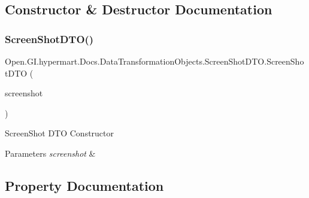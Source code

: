 \subsection{Constructor \& Destructor Documentation}
\hypertarget{class_open_1_1_g_i_1_1hypermart_1_1_docs_1_1_data_transformation_objects_1_1_screen_shot_d_t_o_a1d16d059ad949737184bd5b8061d036d}{}\label{class_open_1_1_g_i_1_1hypermart_1_1_docs_1_1_data_transformation_objects_1_1_screen_shot_d_t_o_a1d16d059ad949737184bd5b8061d036d} 
\subsubsection{\texorpdfstring{Screen\+Shot\+D\+T\+O()}{ScreenShotDTO()}}
{\footnotesize\ttfamily Open.\+G\+I.\+hypermart.\+Docs.\+Data\+Transformation\+Objects.\+Screen\+Shot\+D\+T\+O.\+Screen\+Shot\+D\+TO (\begin{DoxyParamCaption}\item[{\hyperlink{class_open_1_1_g_i_1_1hypermart_1_1_models_1_1_screenshot}{Screenshot}}]{screenshot }\end{DoxyParamCaption})}



Screen\+Shot D\+TO Constructor 


\begin{DoxyParams}{Parameters}
{\em screenshot} & \\
\hline
\end{DoxyParams}


\subsection{Property Documentation}
\hypertarget{class_open_1_1_g_i_1_1hypermart_1_1_docs_1_1_data_transformation_objects_1_1_screen_shot_d_t_o_ae97d094ea2ba7b786d2fd171b12cc3e6}{}\label{class_open_1_1_g_i_1_1hypermart_1_1_docs_1_1_data_transformation_objects_1_1_screen_shot_d_t_o_ae97d094ea2ba7b786d2fd171b12cc3e6} 
